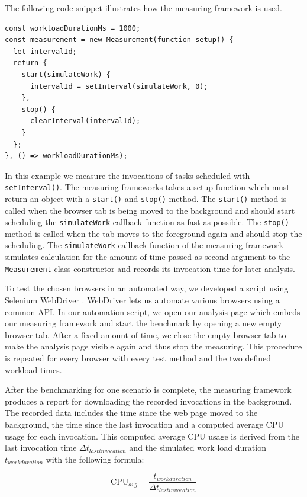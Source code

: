\documentclass[
	ruledheaders=section,%
	class=report,%
	thesis={type=bachelor},%
	accentcolor=9c,%
	custommargins=true,%
	marginpar=false,%
	parskip=half-,%
	fontsize=11pt,%
]{tudapub}
\begin{document}
  The following code snippet illustrates how the measuring framework is used.
\begin{lstlisting}
const workloadDurationMs = 1000;
const measurement = new Measurement(function setup() {
  let intervalId;
  return {
    start(simulateWork) {
      intervalId = setInterval(simulateWork, 0);
    },
    stop() {
      clearInterval(intervalId);
    }
  };
}, () => workloadDurationMs);
\end{lstlisting}
  In this example we measure the invocations of tasks scheduled with \texttt{setInterval()}. The measuring frameworks takes a setup function which must return an object with a \texttt{start()} and \texttt{stop()} method. The \texttt{start()} method is called when the browser tab is being moved to the background and should start scheduling the \texttt{simulateWork} callback function as fast as possible. The \texttt{stop()} method is called when the tab moves to the foreground again and should stop the scheduling. The \texttt{simulateWork} callback function of the measuring framework simulates calculation for the amount of time passed as second argument to the \texttt{Measurement} class constructor and records its invocation time for later analysis.

  To test the chosen browsers in an automated way, we developed a script using Selenium WebDriver \cite{webdriver}. WebDriver lets us automate various browsers using a common API. In our automation script, we open our analysis page which embeds our measuring framework and start the benchmark by opening a new empty browser tab. After a fixed amount of time, we close the empty browser tab to make the analysis page visible again and thus stop the measuring. This procedure is repeated for every browser with every test method and the two defined workload times.

  After the benchmarking for one scenario is complete, the measuring framework produces a report for downloading the recorded invocations in the background. The recorded data includes the time since the web page moved to the background, the time since the last invocation and a computed average CPU usage for each invocation. This computed average CPU usage is derived from the last invocation time $\Delta t_{last invocation}$ and the simulated work load duration $t_{work duration}$  with the following formula:

  \begin{equation*}
    \text{CPU}_{avg} = \frac{t_{work duration}}{\Delta t_{last invocation}}
  \end{equation*}
\end{document}
